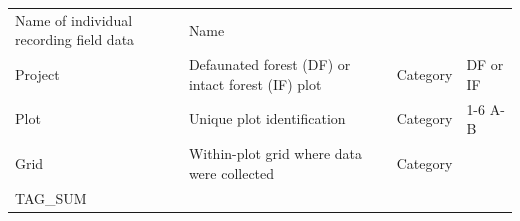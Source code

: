 \documentclass[
  12pt,
]{article}
\begin{document}
\begin{longtable}[]{@{}llll@{}}
\begin{minipage}[t]{0.37\columnwidth}
Name of individual recording field data\strut
\end{minipage} & \begin{minipage}[t]{0.19\columnwidth}\raggedright
Name\strut
\end{minipage} & \begin{minipage}[t]{0.20\columnwidth}\raggedright
\strut
\end{minipage}\tabularnewline
\begin{minipage}[t]{0.13\columnwidth}\raggedright
Project\strut
\end{minipage} & \begin{minipage}[t]{0.37\columnwidth}\raggedright
Defaunated forest (DF) or intact forest (IF) plot\strut
\end{minipage} & \begin{minipage}[t]{0.19\columnwidth}\raggedright
Category\strut
\end{minipage} & \begin{minipage}[t]{0.20\columnwidth}\raggedright
DF or IF\strut
\end{minipage}\tabularnewline
\begin{minipage}[t]{0.13\columnwidth}\raggedright
Plot\strut
\end{minipage} & \begin{minipage}[t]{0.37\columnwidth}\raggedright
Unique plot identification\strut
\end{minipage} & \begin{minipage}[t]{0.19\columnwidth}\raggedright
Category\strut
\end{minipage} & \begin{minipage}[t]{0.20\columnwidth}\raggedright
1-6 A-B\strut
\end{minipage}\tabularnewline
\begin{minipage}[t]{0.13\columnwidth}\raggedright
Grid\strut
\end{minipage} & \begin{minipage}[t]{0.37\columnwidth}\raggedright
Within-plot grid where data were collected\strut
\end{minipage} & \begin{minipage}[t]{0.19\columnwidth}\raggedright
Category\strut
\end{minipage} & \begin{minipage}[t]{0.20\columnwidth}\raggedright
\strut
\end{minipage}\tabularnewline
\begin{minipage}[t]{0.13\columnwidth}\raggedright
TAG\_SUM\strut
\end{minipage} & \begin{minipage}[t]{0.37\columnwidth}\raggedright

\end{minipage}
\end{longtable}
\end{document}
